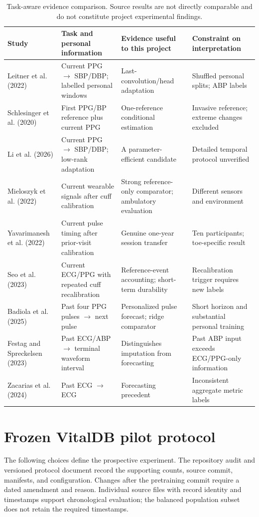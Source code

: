 \documentclass[11pt]{article}
\begin{document}
\begin{table}[t]
\centering\small
\begin{tabularx}{\textwidth}{>{\raggedright\arraybackslash}p{2.1cm}>{\raggedright\arraybackslash}p{2.55cm}Y Y}
\toprule
Study & Task and personal information & Evidence useful to this project & Constraint on interpretation\\
\midrule
Leitner et al. (2022) & Current PPG $\to$ SBP/DBP; labelled personal windows & Last-convolution/head adaptation & Shuffled personal splits; ABP labels\\
Schlesinger et al. (2020) & First PPG/BP reference plus current PPG & One-reference conditional estimation & Invasive reference; extreme changes excluded\\
Li et al. (2026) & Current PPG $\to$ SBP/DBP; low-rank adaptation & A parameter-efficient candidate & Detailed temporal protocol unverified\\
Mieloszyk et al. (2022) & Current wearable signals after cuff calibration & Strong reference-only comparator; ambulatory evaluation & Different sensors and environment\\
Yavarimanesh et al. (2022) & Current pulse timing after prior-visit calibration & Genuine one-year session transfer & Ten participants; toe-specific result\\
Seo et al. (2023) & Current ECG/PPG with repeated cuff recalibration & Reference-event accounting; short-term durability & Recalibration trigger requires new labels\\
Badiola et al. (2025) & Past four PPG pulses $\to$ next pulse & Personalized pulse forecast; ridge comparator & Short horizon and substantial personal training\\
Festag and Spreckelsen (2023) & Past ECG/ABP $\to$ terminal waveform interval & Distinguishes imputation from forecasting & Past ABP input exceeds ECG/PPG-only information\\
Zacarias et al. (2024) & Past ECG $\to$ ECG & Forecasting precedent & Inconsistent aggregate metric labels\\
\bottomrule
\end{tabularx}
\caption{Task-aware evidence comparison. Source results are not directly comparable and do not constitute project experimental findings.}
\label{tab:evidence}
\end{table}

\section{Frozen VitalDB pilot protocol}
\label{sec:protocol}
The following choices define the prospective experiment. The repository audit and versioned protocol document record the supporting counts, source commit, manifests, and configuration. Changes after the pretraining commit require a dated amendment and reason. Individual source files with record identity and timestamps support chronological evaluation; the balanced population subset does not retain the required timestamps.
\end{document}
